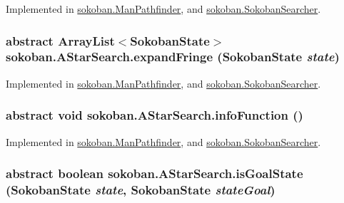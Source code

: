 Implemented in \hyperlink{classsokoban_1_1ManPathfinder_62decfb98167d1f63ea33408c5130e00}{sokoban.ManPathfinder}, and \hyperlink{classsokoban_1_1SokobanSearcher_897cc65b82be53f807b06a71a822a107}{sokoban.SokobanSearcher}.\hypertarget{classsokoban_1_1AStarSearch_d898d53b9ed79238fca960bf6f453b7e}{
\subsubsection[{expandFringe}]{\setlength{\rightskip}{0pt plus 5cm}abstract ArrayList$<${\bf SokobanState}$>$ sokoban.AStarSearch.expandFringe ({\bf SokobanState} {\em state})}}
\label{classsokoban_1_1AStarSearch_d898d53b9ed79238fca960bf6f453b7e}




Implemented in \hyperlink{classsokoban_1_1ManPathfinder_096cfcfa1b5506db10dc160810ffca49}{sokoban.ManPathfinder}, and \hyperlink{classsokoban_1_1SokobanSearcher_fed3f74dd438abffdebe84a6a4d96e62}{sokoban.SokobanSearcher}.\hypertarget{classsokoban_1_1AStarSearch_76eb557a34fba75c6b7a5708288cbbe2}{
\subsubsection[{infoFunction}]{\setlength{\rightskip}{0pt plus 5cm}abstract void sokoban.AStarSearch.infoFunction ()}}
\label{classsokoban_1_1AStarSearch_76eb557a34fba75c6b7a5708288cbbe2}




Implemented in \hyperlink{classsokoban_1_1ManPathfinder_d1511ea4db735c0143acfd91352014d8}{sokoban.ManPathfinder}, and \hyperlink{classsokoban_1_1SokobanSearcher_d180c4da1ca3b7099d1e820843c619d0}{sokoban.SokobanSearcher}.\hypertarget{classsokoban_1_1AStarSearch_8ac8ea41b08c5f3ba2c41e0b0e53c73f}{
\subsubsection[{isGoalState}]{\setlength{\rightskip}{0pt plus 5cm}abstract boolean sokoban.AStarSearch.isGoalState ({\bf SokobanState} {\em state}, \/  {\bf SokobanState} {\em stateGoal})}}
\label{classsokoban_1_1AStarSearch_8ac8ea41b08c5f3ba2c41e0b0e53c73f}




